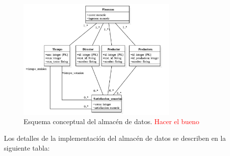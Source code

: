 \documentclass[11pt]{opticajnl}
\begin{document}
\begin{figure}[h]
\centering
\includegraphics[width=0.7\textwidth]{fotos/3.png}
\caption{Esquema conceptual del almacén de datos. \textcolor{red}{Hacer el bueno}}
\label{fig:esquema_almacen}
\end{figure}

Los detalles de la implementación del almacén de datos se describen en la siguiente tabla: 
\end{document}
